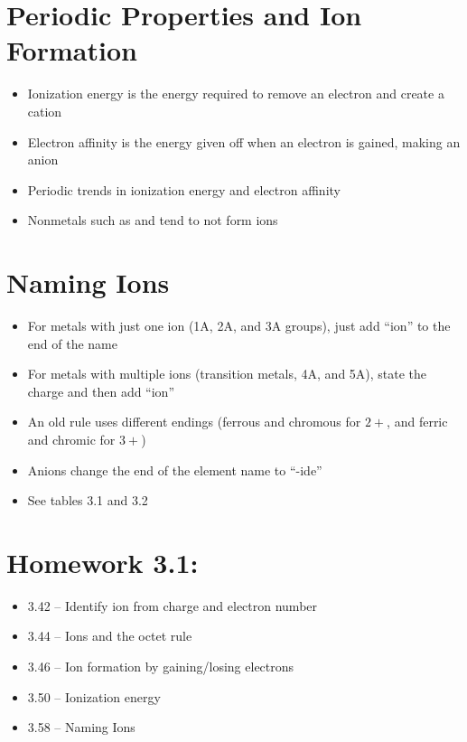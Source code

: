 \documentclass[12pt, openany, letterpaper]{memoir}
\begin{document}
\section{Periodic Properties and Ion Formation}
\begin{itemize}
	\item Ionization energy is the energy required to remove an electron and create a cation
	\item Electron affinity is the energy given off when an electron is gained, making an anion
	\item Periodic trends in ionization energy and electron affinity
	\item Nonmetals such as  and  tend to not form ions
\end{itemize}

\section{Naming Ions}
\begin{itemize}
	\item For metals with just one ion (1A, 2A, and 3A groups), just add ``ion'' to the end of the name
	\item For metals with multiple ions (transition metals, 4A, and 5A), state the charge and then add ``ion''
	\item An old rule uses different endings (ferrous and chromous for $2+$, and ferric and chromic for $3+$)
	\item Anions change the end of the element name to ``-ide''
	\item See tables 3.1 and 3.2
\end{itemize}

\section*{Homework 3.1:}
\begin{itemize}
  \item 3.42 -- Identify ion from charge and electron number
  \item 3.44 -- Ions and the octet rule
  \item 3.46 -- Ion formation by gaining/losing electrons
  \item 3.50 -- Ionization energy
  \item 3.58 -- Naming Ions
\end{itemize}
\end{document}
